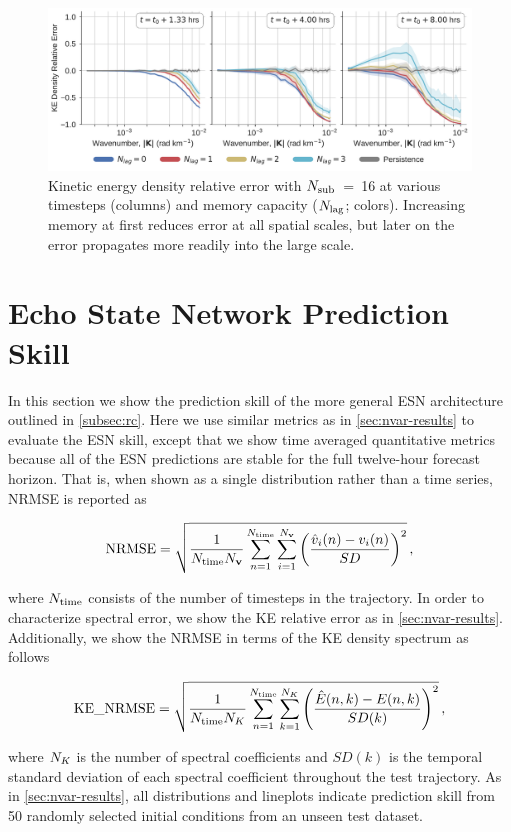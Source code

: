 \documentclass[draft]{agujournal2019}
\begin{document}
\begin{figure}
    \centering
    \includegraphics[width=\textwidth]{figures/nvar_ke_relerr_vs_lag.pdf}
    \caption{Kinetic energy density relative error with $N_\text{sub}$~=~16 at various
        timesteps (columns) and memory capacity ($N_\text{lag}$; colors).
        Increasing memory at first reduces error at all spatial scales, but
        later on the error propagates more readily into the large scale.
    }
    \label{fig:nvar_ke_vs_lag}
\end{figure}

\section{Echo State Network Prediction Skill}
\label{sec:esn-results}

In this section we show the prediction skill of the more general ESN architecture outlined in \cref{subsec:rc}.
Here we use similar metrics as in \cref{sec:nvar-results} to evaluate the ESN
skill, except that we show time averaged quantitative metrics because all of the
ESN predictions are stable for the full twelve-hour forecast horizon.
That is, when shown as a single distribution rather than a time series, NRMSE is reported as
\begin{linenomath*}\begin{equation}
    \text{NRMSE} = \sqrt{
            \dfrac{1}{N_\text{time}N_{\mathbf{v}}}\sum_{n=1}^{N_\text{time}}\sum_{i=1}^{N_{\mathbf{v}}}\left(
        \dfrac{\hat{v}_i(n) - v_i(n)}{SD}
        \right)^2 } \, ,
    \label{eq:total-nrmse}
\end{equation}\end{linenomath*}
where $N_\text{time}$ consists of the number of timesteps in the trajectory.
In order to characterize spectral error, we show the KE relative error as in
\cref{sec:nvar-results}.
Additionally, we show the NRMSE in terms of the KE density spectrum as follows
\begin{linenomath*}\begin{equation}
    \text{KE\_NRMSE} = \sqrt{
            \dfrac{1}{N_\text{time}N_K}\sum_{n=1}^{N_\text{time}}\sum_{k=1}^{N_K}\left(
            \dfrac{\hat{E}(n, k) - E(n, k)}{SD(k)}
            \right)^2} \, ,
    \label{eq:ke_nrmse}
\end{equation}\end{linenomath*}
where $N_K$ is the number of spectral coefficients and $SD(k)$ is the temporal
standard deviation of each spectral coefficient throughout the test trajectory.
As in \cref{sec:nvar-results}, all distributions and lineplots indicate
prediction skill from 50 randomly selected initial conditions from an unseen
test dataset.
\end{document}
